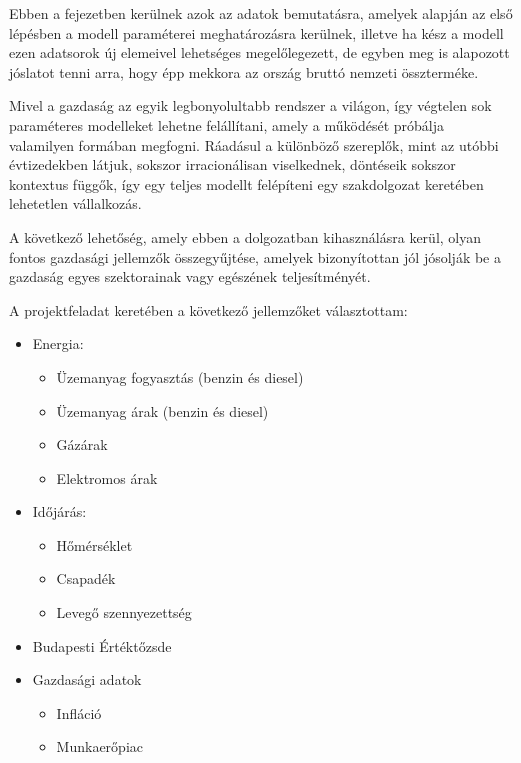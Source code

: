 Ebben a fejezetben kerülnek azok az adatok bemutatásra, amelyek alapján az első lépésben a modell
paraméterei meghatározásra kerülnek, illetve ha kész a modell ezen adatsorok új elemeivel
lehetséges megelőlegezett, de egyben meg is alapozott jóslatot tenni arra, hogy épp mekkora az
ország bruttó nemzeti összterméke.

Mivel a gazdaság az egyik legbonyolultabb rendszer a világon, így végtelen sok paraméteres
modelleket lehetne felállítani, amely a működését próbálja valamilyen formában megfogni. Ráadásul a
különböző szereplők, mint az utóbbi évtizedekben látjuk, sokszor irracionálisan viselkednek,
döntéseik sokszor kontextus függők, így egy teljes modellt felépíteni egy szakdolgozat keretében
lehetetlen vállalkozás.

A következő lehetőség, amely ebben a dolgozatban kihasználásra kerül, olyan fontos gazdasági
jellemzők összegyűjtése, amelyek bizonyítottan jól jósolják be a gazdaság egyes szektorainak vagy
egészének teljesítményét.

A projektfeladat keretében a következő jellemzőket választottam:

\begin{itemize}
    \item Energia:
          \begin{itemize}
              \item Üzemanyag fogyasztás (benzin és diesel)
              \item Üzemanyag árak (benzin és diesel)
              \item Gázárak
              \item Elektromos árak
          \end{itemize}
    \item Időjárás:
          \begin{itemize}
              \item Hőmérséklet
              \item Csapadék
              \item Levegő szennyezettség
          \end{itemize}
    \item Budapesti Értéktőzsde
    \item Gazdasági adatok
          \begin{itemize}
              \item Infláció
              \item Munkaerőpiac
          \end{itemize}
\end{itemize}

